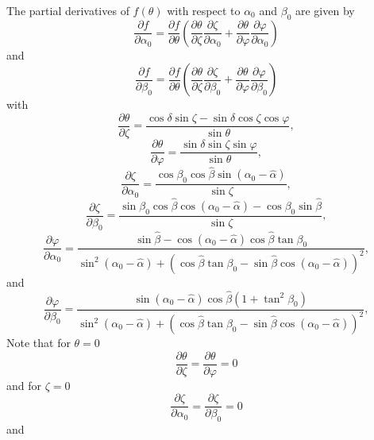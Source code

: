 \documentclass{article}[12pt,a4]
\begin{document}
The partial derivatives of $f(\theta)$ with respect to $\alpha_0$ and $\beta_0$ are given by
\begin{equation}
\frac{\partial f}{\partial \alpha_0} = \frac{\partial f}{\partial \theta}
\left(
\frac{\partial \theta}{\partial \zeta} \frac{\partial \zeta}{\partial \alpha_0} +
\frac{\partial \theta}{\partial \varphi} \frac{\partial \varphi}{\partial \alpha_0}
\right)
\end{equation}
and
\begin{equation}
\frac{\partial f}{\partial \beta_0} = \frac{\partial f}{\partial \theta}
\left(
\frac{\partial \theta}{\partial \zeta} \frac{\partial \zeta}{\partial \beta_0} +
\frac{\partial \theta}{\partial \varphi} \frac{\partial \varphi}{\partial \beta_0}
\right)
\end{equation}
with
\begin{equation}
\frac{\partial \theta}{\partial \zeta} = \frac{\cos \delta \sin \zeta - \sin \delta \cos \zeta \cos \varphi}{\sin \theta} ,
\end{equation}
\begin{equation}
\frac{\partial \theta}{\partial \varphi} = \frac{\sin \delta \sin \zeta \sin \varphi}{\sin \theta} ,
\end{equation}
\begin{equation}
\frac{\partial \zeta}{\partial \alpha_0}  = \frac{\cos \beta_0 \cos \hat{\beta} \sin(\alpha_0-\hat{\alpha})}{\sin \zeta} ,
\end{equation}
\begin{equation}
\frac{\partial \zeta}{\partial \beta_0}  = \frac{\sin \beta_0 \cos \hat{\beta} \cos(\alpha_0-\hat{\alpha}) - \cos \beta_0 \sin \hat{\beta}}{\sin \zeta} ,
\end{equation}
\begin{equation}
\frac{\partial \varphi}{\partial \alpha_0}  = \frac
{\sin \hat{\beta} - \cos(\alpha_0-\hat{\alpha}) \cos \hat{\beta} \tan \beta_0}
{\sin^2(\alpha_0-\hat{\alpha}) + (\cos \hat{\beta} \tan \beta_0 - \sin \hat{\beta} \cos(\alpha_0-\hat{\alpha}))^2} ,
\end{equation}
and
\begin{equation}
\frac{\partial \varphi}{\partial \beta_0}  = \frac
{\sin(\alpha_0-\hat{\alpha}) \cos \hat{\beta} (1 + \tan^2 \beta_0)}
{\sin^2(\alpha_0-\hat{\alpha}) + (\cos \hat{\beta} \tan \beta_0 - \sin \hat{\beta} \cos(\alpha_0-\hat{\alpha}))^2} ,
\end{equation}
Note that for $\theta=0$
\begin{equation}
\frac{\partial \theta}{\partial \zeta} = \frac{\partial \theta}{\partial \varphi} = 0
\end{equation}
and for $\zeta=0$
\begin{equation}
\frac{\partial \zeta}{\partial \alpha_0}  = \frac{\partial \zeta}{\partial \beta_0} = 0
\end{equation}
and
\end{document}
